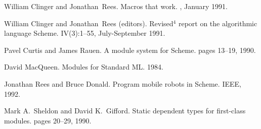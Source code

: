 \begin{thebibliography}{10}

William Clinger and Jonathan~Rees.
\newblock Macros that work.
, January 1991.

William Clinger and Jonathan~Rees (editors).
\newblock Revised${}^4$ report on the algorithmic language {S}cheme.
 IV(3):1--55, July-September 1991.

Pavel Curtis and James Rauen.
\newblock A module system for Scheme.
pages 13--19, 1990.

David MacQueen.
\newblock Modules for Standard ML.
1984.

Jonathan Rees and Bruce Donald.
\newblock Program mobile robots in Scheme.
 IEEE, 1992. 

Mark A.~Sheldon and David K.~Gifford.
\newblock Static dependent types for first-class modules.
pages 20--29, 1990.

\end{thebibliography}




